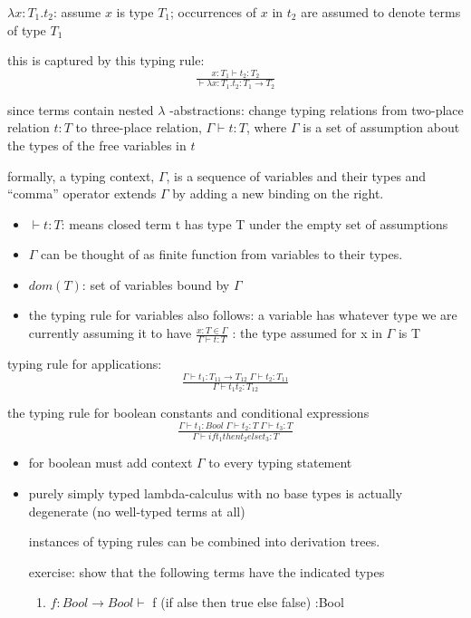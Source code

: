 \documentclass[11pt]{article}
\begin{document}
\(\lambda x:T_1. t_2\): assume \(x\) is type \(T_1\); occurrences of \(x\) in \(t_2\) are assumed to denote terms of type \(T_1\)

this is captured by this typing rule:
\begin{equation}
\tfrac{x:T_1 \vdash t_2 : T_2}{\vdash \lambda x:T_1.t_2 : T_1 \rightarrow T_2 }
\end{equation}

since terms contain nested \(\lambda\) -abstractions: change typing relations from two-place relation \(t : T\) to three-place relation, \(\Gamma \vdash t : T\), where \(\Gamma\) is a set of assumption about the types of the free variables in \(t\)

formally, a typing context, \(\Gamma\), is a sequence of variables and their types and ``comma'' operator extends $\Gamma$ by adding a new binding on the right.

\begin{itemize}
\item \(\vdash t : T\): means closed term t has type T under the empty set of assumptions
\item \(\Gamma\) can be thought of as finite function from variables to their types.
\item \(dom(T)\): set of variables bound by \(\Gamma\)
\item the typing rule for variables also follows: a variable has whatever type we are currently assuming it to have
\(\tfrac{x:T \in \Gamma}{\Gamma \vdash t : T}\) : the type assumed for x in \(\Gamma\) is T
\end{itemize}

typing rule for applications:
\begin{equation}
\tfrac{\Gamma \vdash t_1 : T_{11} \rightarrow T_{12} \; \Gamma \vdash t_2 : T_11}{\Gamma \vdash t_1 t_2 : T_12}
\end{equation}


the typing rule for boolean constants and conditional expressions
\begin{equation}
\tfrac{\Gamma \vdash t_1 : Bool \; \Gamma \vdash t_2 : T \; \Gamma \vdash t_3 : T}{\Gamma \vdash if t_1 then t_2 else t_3 : T}
\end{equation}

\begin{itemize}
\item for boolean must add context \(\Gamma\) to every typing statement

\item purely simply typed lambda-calculus with no base types is actually degenerate (no well-typed terms at all)

instances of typing rules can be combined into derivation trees.

exercise: show that the following terms have the indicated types
\begin{enumerate}
\item \(f: Bool \rightarrow Bool \vdash\) f (if alse then true else false) :Bool
\end{enumerate}
\end{itemize}
\end{document}
